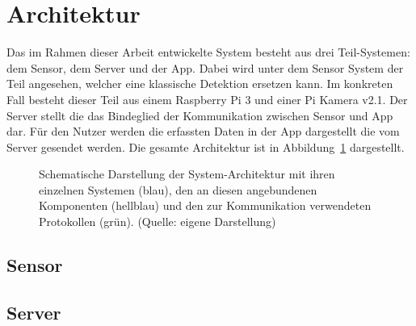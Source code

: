 \section{Architektur}\label{ch:Architektur}
Das im Rahmen dieser Arbeit entwickelte System besteht aus drei Teil-Systemen: dem Sensor, dem Server und der App.
Dabei wird unter dem Sensor System der Teil angesehen, welcher eine klassische Detektion ersetzen kann.
Im konkreten Fall besteht dieser Teil aus einem Raspberry Pi 3 und einer Pi Kamera v2.1.
Der Server stellt die das Bindeglied der Kommunikation zwischen Sensor und App dar.
Für den Nutzer werden die erfassten Daten in der App dargestellt die vom Server gesendet werden.
Die gesamte Architektur ist in Abbildung~\ref{fig:Architektur} dargestellt.

\begin{figure}[h]
    \myImagePos{}
    
    \caption[Schematische Darstellung der System-Architektur]{Schematische Darstellung der System-Architektur mit ihren einzelnen Systemen (blau), den an diesen angebundenen Komponenten (hellblau) und den zur Kommunikation verwendeten Protokollen (grün). (Quelle: eigene Darstellung)}
    \label{fig:Architektur}
\end{figure}

\subsection{Sensor}\label{ch:Architektur_Sensor}

\subsection{Server}\label{ch:Architektur_Server}

